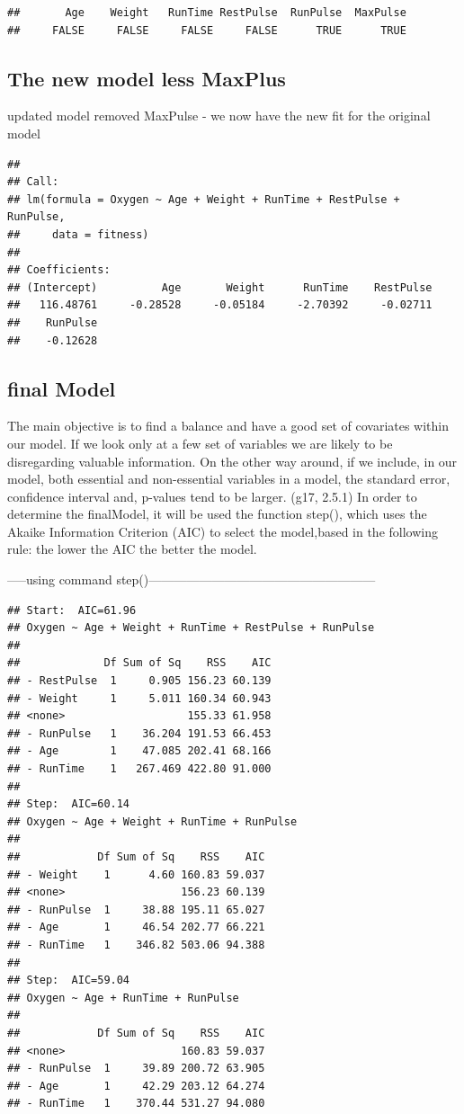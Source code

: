 \documentclass[]{article}
\begin{document}
\begin{verbatim}
##       Age    Weight   RunTime RestPulse  RunPulse  MaxPulse 
##     FALSE     FALSE     FALSE     FALSE      TRUE      TRUE
\end{verbatim}

\subsection{The new model less
MaxPlus}\label{the-new-model-less-maxplus}

updated model removed MaxPulse - we now have the new fit for the
original model

\begin{verbatim}
## 
## Call:
## lm(formula = Oxygen ~ Age + Weight + RunTime + RestPulse + RunPulse, 
##     data = fitness)
## 
## Coefficients:
## (Intercept)          Age       Weight      RunTime    RestPulse  
##   116.48761     -0.28528     -0.05184     -2.70392     -0.02711  
##    RunPulse  
##    -0.12628
\end{verbatim}

\subsection{final Model}\label{final-model}

The main objective is to find a balance and have a good set of
covariates within our model. If we look only at a few set of variables
we are likely to be disregarding valuable information. On the other way
around, if we include, in our model, both essential and non-essential
variables in a model, the standard error, confidence interval and,
p-values tend to be larger. (g17, 2.5.1) In order to determine the
finalModel, it will be used the function step(), which uses the Akaike
Information Criterion (AIC) to select the model,based in the following
rule: the lower the AIC the better the model.

-----using command
step()------------------------------------------------------

\begin{verbatim}
## Start:  AIC=61.96
## Oxygen ~ Age + Weight + RunTime + RestPulse + RunPulse
## 
##             Df Sum of Sq    RSS    AIC
## - RestPulse  1     0.905 156.23 60.139
## - Weight     1     5.011 160.34 60.943
## <none>                   155.33 61.958
## - RunPulse   1    36.204 191.53 66.453
## - Age        1    47.085 202.41 68.166
## - RunTime    1   267.469 422.80 91.000
## 
## Step:  AIC=60.14
## Oxygen ~ Age + Weight + RunTime + RunPulse
## 
##            Df Sum of Sq    RSS    AIC
## - Weight    1      4.60 160.83 59.037
## <none>                  156.23 60.139
## - RunPulse  1     38.88 195.11 65.027
## - Age       1     46.54 202.77 66.221
## - RunTime   1    346.82 503.06 94.388
## 
## Step:  AIC=59.04
## Oxygen ~ Age + RunTime + RunPulse
## 
##            Df Sum of Sq    RSS    AIC
## <none>                  160.83 59.037
## - RunPulse  1     39.89 200.72 63.905
## - Age       1     42.29 203.12 64.274
## - RunTime   1    370.44 531.27 94.080
\end{verbatim}
\end{document}
